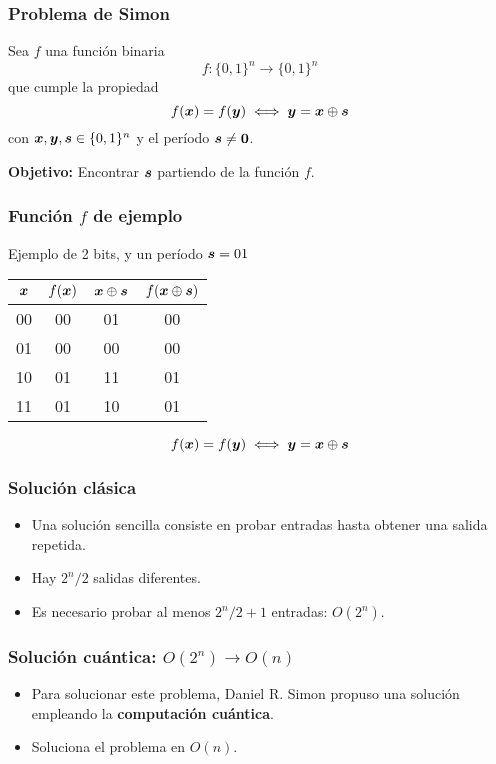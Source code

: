 \begin{frame}
\frametitle{Problema de Simon}

Sea $f$ una función binaria
$$f:\{0,1\}^n \rightarrow \{0,1\}^n$$
que cumple la propiedad
$$ f(\boldsymbol{x}) = f(\boldsymbol{y}) \iff \boldsymbol{y} = \boldsymbol{x} \oplus \boldsymbol{s}$$
con $\boldsymbol{x}, \boldsymbol{y}, \boldsymbol{s} \in \{0,1\}^n$ y el período $\boldsymbol{s} \neq \boldsymbol{0}$.

\vspace{1cm}

\textbf{Objetivo: }Encontrar $\boldsymbol{s}$ partiendo de la función $f$.


\end{frame}
\begin{frame}
\frametitle{Función $f$ de ejemplo}

Ejemplo de 2 bits, y un período $\boldsymbol{s} = 01$

\begin{center}
\begin{tabular}{cccc}
	\toprule
	$\boldsymbol{x}$ & $f(\boldsymbol{x})$ & $\boldsymbol{x} \oplus \boldsymbol{s}$ & $f(\boldsymbol{x} \oplus \boldsymbol{s})$\\
	\midrule
	00 & 00 & 01 & 00\\
	01 & 00 & 00 & 00\\
	10 & 01 & 11 & 01\\
	11 & 01 & 10 & 01\\
	\bottomrule
\end{tabular}
\end{center}

$$ f(\boldsymbol{x}) = f(\boldsymbol{y}) \iff \boldsymbol{y} = \boldsymbol{x} \oplus \boldsymbol{s}$$

\end{frame}
\begin{frame}
\frametitle{Solución clásica}
\begin{itemize}
\item Una solución sencilla consiste en probar entradas hasta obtener una salida 
repetida.

\item Hay $2^n/2$ salidas diferentes.

\item Es necesario probar al menos $2^n/2 + 1$ entradas: $O(2^n)$.
\end{itemize}
\end{frame}
\begin{frame}
\frametitle{Solución cuántica: $O(2^n) \rightarrow O(n)$}
\begin{itemize}
\item Para solucionar este problema, Daniel R. Simon propuso una solución 
empleando la \textbf{computación cuántica}.
\item Soluciona el problema en $O(n)$.
\end{itemize}



\end{frame}
